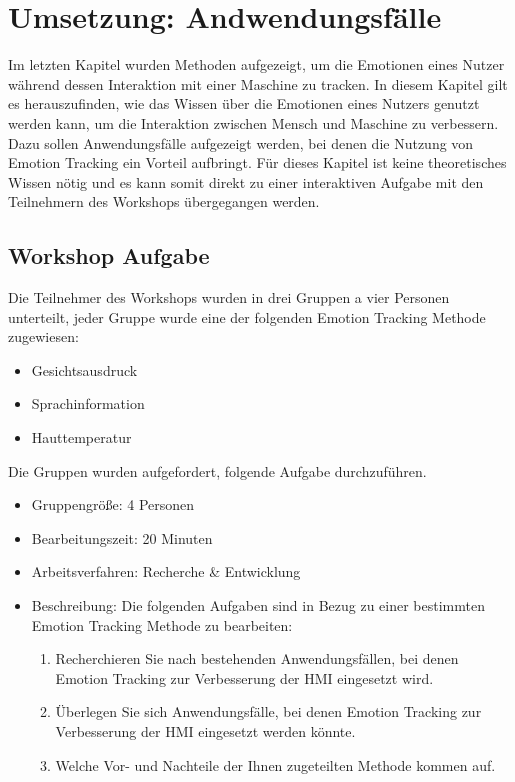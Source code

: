 \section{Umsetzung: Andwendungsfälle}\label{Umsetzung_Anwendungsfaelle}
Im letzten Kapitel wurden Methoden aufgezeigt, um die Emotionen eines Nutzer während dessen Interaktion mit einer Maschine zu tracken. In diesem Kapitel gilt es herauszufinden, wie das Wissen über die Emotionen eines Nutzers genutzt werden kann, um die Interaktion zwischen Mensch und Maschine zu verbessern. Dazu sollen Anwendungsfälle aufgezeigt werden, bei denen die Nutzung von Emotion Tracking ein Vorteil aufbringt. Für dieses Kapitel ist keine theoretisches Wissen nötig und es kann somit direkt zu einer interaktiven Aufgabe mit den Teilnehmern des Workshops übergegangen werden.

\subsection{Workshop Aufgabe}
Die Teilnehmer des Workshops wurden in drei Gruppen a vier Personen unterteilt, jeder Gruppe wurde eine der folgenden Emotion Tracking Methode zugewiesen:

\begin{itemize}
	\item Gesichtsausdruck
	\item Sprachinformation
	\item Hauttemperatur
\end{itemize}
Die Gruppen wurden aufgefordert, folgende Aufgabe durchzuführen.
\begin{itemize}
	\item Gruppengröße: 4 Personen
	\item Bearbeitungszeit: 20 Minuten
	\item Arbeitsverfahren: Recherche & Entwicklung
	\item Beschreibung: Die folgenden Aufgaben sind in Bezug zu einer bestimmten Emotion Tracking Methode zu bearbeiten:
	\begin{enumerate}
		\item Recherchieren Sie nach bestehenden Anwendungsfällen, bei denen Emotion Tracking zur Verbesserung der HMI eingesetzt wird.
		\item Überlegen Sie sich Anwendungsfälle, bei denen Emotion Tracking zur Verbesserung der HMI eingesetzt werden könnte.
		\item Welche Vor- und Nachteile der Ihnen zugeteilten Methode kommen auf.
	\end{enumerate}
\end{itemize}

